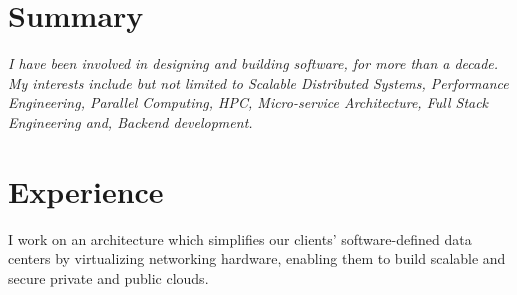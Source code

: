 \begin{minipage}[t]{0.68\textwidth} %

\section{Summary}
\textit{
I have been involved in designing and building software, for more than a decade.
\\My interests include but not limited to Scalable Distributed Systems, Performance Engineering,
Parallel Computing, HPC, Micro-service Architecture, Full Stack Engineering and, Backend development.
}



\section{Experience}

I work on an architecture which simplifies our clients’ software-defined data centers by virtualizing networking hardware, enabling them to build scalable and secure private and public clouds.
\vspace{\topsep} %


\end{minipage}
